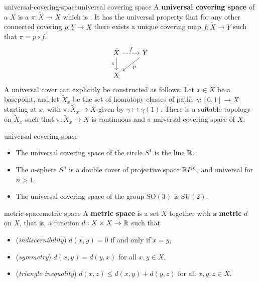 \begin{topic}{universal-covering-space}{universal covering space}
    A \textbf{universal covering space} of a  $X$ is a  $\pi : \tilde{X} \to X$ which is . It has the universal property that for any other connected covering $p : Y \to X$ there exists a unique covering map $f : \tilde{X} \to Y$ such that $\pi = p \circ f$.
    \[ \begin{tikzcd} \tilde{X} \arrow[swap]{d}{\pi} \arrow[dashed]{r}{f} & Y \arrow{dl}{p} \\ X & \end{tikzcd} \]
    A universal cover can explicitly be constructed as follows. Let $x \in X$ be a basepoint, and let $\tilde{X}_x$ be the set of homotopy classes of paths $\gamma : [0, 1] \to X$ starting at $x$, with $\pi : \tilde{X}_x \to X$ given by $\gamma \mapsto \gamma(1)$. There is a suitable topology on $\tilde{X}_x$ such that $\pi : \tilde{X}_x \to X$ is continuous and a universal covering space of $X$.
\end{topic}

\begin{example}{universal-covering-space}
    \begin{itemize}
        \item The universal covering space of the circle $S^1$ is the line $\mathbb{R}$.
        \item The $n$-sphere $S^n$ is a double cover of projective space $\mathbb{R} P^n$, and universal for $n > 1$.
        \item The universal covering space of the group $\text{SO}(3)$ is $\text{SU}(2)$. 
    \end{itemize}    
\end{example}

\begin{topic}{metric-space}{metric space}
    A \textbf{metric space} is a set $X$ together with a \textbf{metric} $d$ on $X$, that is, a function $d : X \times X \to \mathbb{R}$ such that
    \begin{itemize}
        \item (\textit{indiscernibility}) $d(x, y) = 0$ if and only if $x = y$,
        \item (\textit{symmetry}) $d(x, y) = d(y, x)$ for all $x, y \in X$,
        \item (\textit{triangle inequality}) $d(x, z) \le d(x, y) + d(y, z)$ for all $x, y, z \in X$.
    \end{itemize}
\end{topic}

